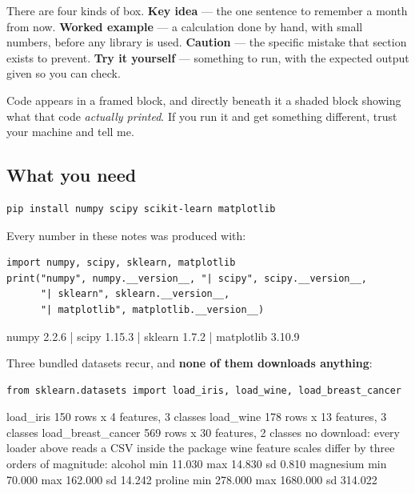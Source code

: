 \documentclass[11pt]{article}
\begin{document}
There are four kinds of box. \textbf{Key idea} --- the one sentence to
remember a month from now. \textbf{Worked example} --- a calculation done by
hand, with small numbers, before any library is used. \textbf{Caution} ---
the specific mistake that section exists to prevent. \textbf{Try it
yourself} --- something to run, with the expected output given so you can
check.

Code appears in a framed block, and directly beneath it a shaded block
showing what that code \emph{actually printed}. If you run it and get
something different, trust your machine and tell me.

\subsection{What you need}

\begin{lstlisting}
pip install numpy scipy scikit-learn matplotlib
\end{lstlisting}

Every number in these notes was produced with:

\begin{lstlisting}
import numpy, scipy, sklearn, matplotlib
print("numpy", numpy.__version__, "| scipy", scipy.__version__,
      "| sklearn", sklearn.__version__,
      "| matplotlib", matplotlib.__version__)
\end{lstlisting}
\begin{codeout}
numpy 2.2.6 | scipy 1.15.3 | sklearn 1.7.2 | matplotlib 3.10.9
\end{codeout}

Three bundled datasets recur, and \textbf{none of them downloads anything}:

\begin{lstlisting}
from sklearn.datasets import load_iris, load_wine, load_breast_cancer
\end{lstlisting}
\begin{codeout}
load_iris           150 rows x  4 features, 3 classes
load_wine           178 rows x 13 features, 3 classes
load_breast_cancer  569 rows x 30 features, 2 classes
no download: every loader above reads a CSV inside the package
wine feature scales differ by three orders of magnitude:
  alcohol          min    11.030  max    14.830  sd     0.810
  magnesium        min    70.000  max   162.000  sd    14.242
  proline          min   278.000  max  1680.000  sd   314.022
\end{codeout}
\end{document}
